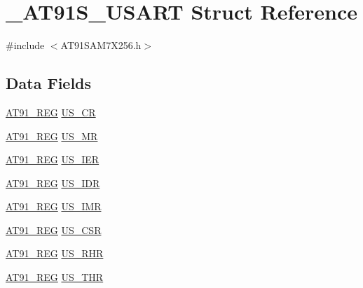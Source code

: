 \hypertarget{struct__AT91S__USART}{\section{\-\_\-\-A\-T91\-S\-\_\-\-U\-S\-A\-R\-T Struct Reference}
\label{struct__AT91S__USART}
}


{\ttfamily \#include $<$A\-T91\-S\-A\-M7\-X256.\-h$>$}

\subsection*{Data Fields}
\begin{DoxyCompactItemize}
\item 
\hyperlink{GCC_2ARM7__AT91SAM7S_2AT91SAM7X256_8h_a712ad5a1ac1bd02f3e95a7526c283ce1}{A\-T91\-\_\-\-R\-E\-G} \hyperlink{struct__AT91S__USART_a02c84ac26acfbb9621cde9e11e70b3e1}{U\-S\-\_\-\-C\-R}
\item 
\hyperlink{GCC_2ARM7__AT91SAM7S_2AT91SAM7X256_8h_a712ad5a1ac1bd02f3e95a7526c283ce1}{A\-T91\-\_\-\-R\-E\-G} \hyperlink{struct__AT91S__USART_a091b71f9f606a54b115910aed19d5416}{U\-S\-\_\-\-M\-R}
\item 
\hyperlink{GCC_2ARM7__AT91SAM7S_2AT91SAM7X256_8h_a712ad5a1ac1bd02f3e95a7526c283ce1}{A\-T91\-\_\-\-R\-E\-G} \hyperlink{struct__AT91S__USART_a32f11fc267293f03d51a7f7e9435f9f7}{U\-S\-\_\-\-I\-E\-R}
\item 
\hyperlink{GCC_2ARM7__AT91SAM7S_2AT91SAM7X256_8h_a712ad5a1ac1bd02f3e95a7526c283ce1}{A\-T91\-\_\-\-R\-E\-G} \hyperlink{struct__AT91S__USART_acdccf0e5fc2b85fa777ac58a968139b7}{U\-S\-\_\-\-I\-D\-R}
\item 
\hyperlink{GCC_2ARM7__AT91SAM7S_2AT91SAM7X256_8h_a712ad5a1ac1bd02f3e95a7526c283ce1}{A\-T91\-\_\-\-R\-E\-G} \hyperlink{struct__AT91S__USART_ad9c73a10ef0097e1f414c55091b77b10}{U\-S\-\_\-\-I\-M\-R}
\item 
\hyperlink{GCC_2ARM7__AT91SAM7S_2AT91SAM7X256_8h_a712ad5a1ac1bd02f3e95a7526c283ce1}{A\-T91\-\_\-\-R\-E\-G} \hyperlink{struct__AT91S__USART_ad6d83c447c95577160767aeea0f1a404}{U\-S\-\_\-\-C\-S\-R}
\item 
\hyperlink{GCC_2ARM7__AT91SAM7S_2AT91SAM7X256_8h_a712ad5a1ac1bd02f3e95a7526c283ce1}{A\-T91\-\_\-\-R\-E\-G} \hyperlink{struct__AT91S__USART_a08ea9921359c45c640b6911fda1dddfb}{U\-S\-\_\-\-R\-H\-R}
\item 
\hyperlink{GCC_2ARM7__AT91SAM7S_2AT91SAM7X256_8h_a712ad5a1ac1bd02f3e95a7526c283ce1}{A\-T91\-\_\-\-R\-E\-G} \hyperlink{struct__AT91S__USART_a8db8959953584eac2c327f2e35bacc73}{U\-S\-\_\-\-T\-H\-R}

\end{DoxyCompactItemize}
